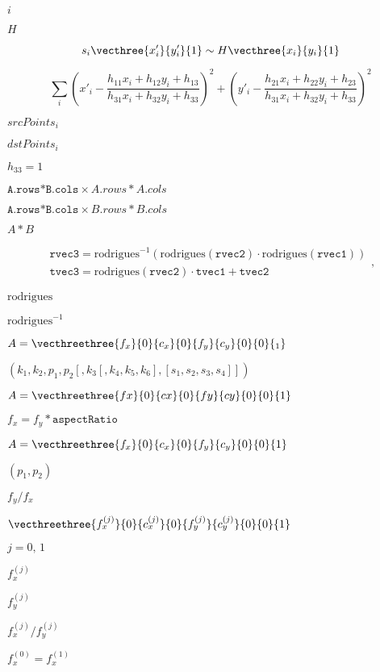 \documentclass{article}
\begin{document}
$i$
\pagebreak

$H$
\pagebreak

\[s_i  \vecthree{x'_i}{y'_i}{1} \sim H  \vecthree{x_i}{y_i}{1}\]
\pagebreak

\[\sum _i \left ( x'_i- \frac{h_{11} x_i + h_{12} y_i + h_{13}}{h_{31} x_i + h_{32} y_i + h_{33}} \right )^2+ \left ( y'_i- \frac{h_{21} x_i + h_{22} y_i + h_{23}}{h_{31} x_i + h_{32} y_i + h_{33}} \right )^2\]
\pagebreak

$srcPoints_i$
\pagebreak

$dstPoints_i$
\pagebreak

$h_{33}=1$
\pagebreak

$\texttt{A.rows*B.cols} \times {A.rows*A.cols}$
\pagebreak

$\texttt{A.rows*B.cols} \times {B.rows*B.cols}$
\pagebreak

$A*B$
\pagebreak

\[\begin{array}{l} \texttt{rvec3} =  \mathrm{rodrigues} ^{-1} \left ( \mathrm{rodrigues} ( \texttt{rvec2} )  \cdot \mathrm{rodrigues} ( \texttt{rvec1} ) \right )  \\ \texttt{tvec3} =  \mathrm{rodrigues} ( \texttt{rvec2} )  \cdot \texttt{tvec1} +  \texttt{tvec2} \end{array} ,\]
\pagebreak

$\mathrm{rodrigues}$
\pagebreak

$\mathrm{rodrigues}^{-1}$
\pagebreak

$A = \vecthreethree{f_x}{0}{c_x}{0}{f_y}{c_y}{0}{0}{_1}$
\pagebreak

$(k_1, k_2, p_1, p_2[, k_3[, k_4, k_5, k_6],[s_1, s_2, s_3, s_4]])$
\pagebreak

$A = \vecthreethree{fx}{0}{cx}{0}{fy}{cy}{0}{0}{1}$
\pagebreak

$f_x = f_y * \texttt{aspectRatio}$
\pagebreak

$A = \vecthreethree{f_x}{0}{c_x}{0}{f_y}{c_y}{0}{0}{1}$
\pagebreak

$(p_1, p_2)$
\pagebreak

$f_y/f_x$
\pagebreak

$\vecthreethree{f_x^{(j)}}{0}{c_x^{(j)}}{0}{f_y^{(j)}}{c_y^{(j)}}{0}{0}{1}$
\pagebreak

$j = 0,\, 1$
\pagebreak

$f^{(j)}_x$
\pagebreak

$f^{(j)}_y$
\pagebreak

$f^{(j)}_x/f^{(j)}_y$
\pagebreak

$f^{(0)}_x=f^{(1)}_x$
\pagebreak
\end{document}
